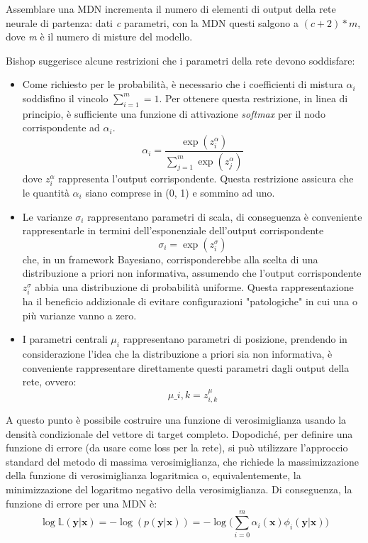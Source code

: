 Assemblare una MDN incrementa il numero di elementi di output della rete neurale di partenza: dati \textit{c} parametri, con la MDN questi salgono a $(c + 2) * m$, dove \textit{m} è il numero di misture del modello.

Bishop suggerisce alcune restrizioni che i parametri della rete devono soddisfare:
\begin{itemize}
	\item Come richiesto per le probabilità, è necessario che i coefficienti di mistura $\alpha_i$ soddisfino il vincolo $\sum_{i=1}^m = 1$. Per ottenere questa restrizione, in linea di principio, è sufficiente una funzione di attivazione \textit{softmax} per il nodo corrispondente ad $\alpha_i$.
	\begin{equation}
		\label{softmax}
		\alpha_i = \frac{\exp(z_i^\alpha)}{\sum_{j=1}^m\exp(z_j^\alpha)}
	\end{equation}
	dove $z_i^\alpha$ rappresenta l'output corrispondente. Questa restrizione assicura che le quantità $\alpha_i$ siano comprese in (0, 1) e sommino ad uno.
	\item Le varianze $\sigma_i$ rappresentano parametri di scala, di conseguenza è conveniente rappresentarle in termini dell'esponenziale dell'output corrispondente
	\begin{equation}
		\label{exponential}
		\sigma_i = \exp(z_i^\sigma)
	\end{equation}
	che, in un framework Bayesiano, corrisponderebbe alla scelta di una distribuzione a priori non informativa, assumendo che l'output corrispondente $z_i^\sigma$ abbia una distribuzione di probabilità uniforme. Questa rappresentazione ha il beneficio addizionale di evitare configurazioni "patologiche" in cui una o più varianze vanno a zero.
	\item I parametri centrali $\mu_i$ rappresentano parametri di posizione, prendendo in considerazione l'idea che la distribuzione a priori sia non informativa, è conveniente rappresentare direttamente questi parametri dagli output della rete, ovvero:
	\begin{equation}
		\label{mus}
		\mu\_{i,k} = z_{i,k}^\mu
	\end{equation}
\end{itemize}

A questo punto è possibile costruire una funzione di verosimiglianza usando la densità condizionale del vettore di target completo. Dopodiché, per definire una funzione di errore (da usare come loss per la rete), si può utilizzare l'approccio standard del metodo di massima verosimiglianza, che richiede la massimizzazione della funzione di verosimiglianza logaritmica o, equivalentemente, la minimizzazione del logaritmo negativo della verosimiglianza. Di conseguenza, la funzione di errore per una MDN è:
\begin{equation}
	\label{mdnerror}
	\log\mathbb{L}(\boldsymbol{y} | \boldsymbol{x}) = - \log(p(\boldsymbol{y} | \boldsymbol{x})) = - \log\bigg(\sum_{i=0}^m \alpha_i(\boldsymbol{x})\phi_i(\boldsymbol{y} | \boldsymbol{x})\bigg)
\end{equation}
